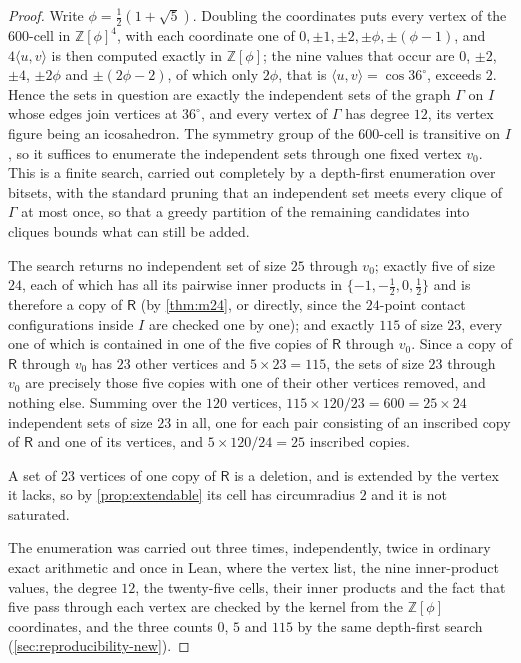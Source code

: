 \documentclass[11pt,reqno]{amsart}
\renewcommand{\_}{\origunderscore\allowbreak}
\numberwithin{equation}{section}
\theoremstyle{plain}
\theoremstyle{definition}
\theoremstyle{remark}
\newcommand{\Rt}{\mathsf{R}}                 %
\begin{document}
\begin{proof}
Write $\phi=\tfrac12(1+\sqrt5)$. Doubling the coordinates puts every
vertex of the $600$-cell in $\mathbb{Z}[\phi]^4$, with each coordinate
one of $0,\pm1,\pm2,\pm\phi,\pm(\phi-1)$, and $4\langle u,v\rangle$ is
then computed exactly in $\mathbb{Z}[\phi]$; the nine values that occur
are $0$, $\pm2$, $\pm4$, $\pm2\phi$ and $\pm(2\phi-2)$, of which only
$2\phi$, that is $\langle u,v\rangle=\cos36^\circ$, exceeds $2$. Hence the
sets in question are exactly the independent sets of the graph $\Gamma$
on $I$ whose edges join vertices at $36^\circ$, and every vertex of
$\Gamma$ has degree $12$, its vertex figure being an icosahedron. The
symmetry group of the $600$-cell is transitive on $I$, so it suffices to
enumerate the independent sets through one fixed vertex $v_0$. This is a
finite search, carried out completely by a depth-first
enumeration over bitsets, with the standard pruning that an independent
set meets every clique of $\Gamma$ at most once, so that a greedy
partition of the remaining candidates into cliques bounds what can still
be added.

The search returns no independent set of size $25$ through $v_0$;
exactly five of size $24$, each of which has all its pairwise inner
products in $\{-1,-\tfrac12,0,\tfrac12\}$ and is therefore a copy of
$\Rt$ (by \cref{thm:m24}, or directly, since the $24$-point contact
configurations inside $I$ are checked one by one); and exactly $115$ of
size $23$, every one of which is contained in one of the five copies of
$\Rt$ through $v_0$. Since a copy of $\Rt$ through $v_0$ has $23$ other
vertices and $5\times23=115$, the sets of size $23$ through $v_0$ are
precisely those five copies with one of their other vertices removed,
and nothing else. Summing over the $120$ vertices, $115\times120/23=600
=25\times24$ independent sets of size $23$ in all, one for each pair
consisting of an inscribed copy of $\Rt$ and one of its vertices, and
$5\times120/24=25$ inscribed copies.

A set of $23$ vertices of one copy of $\Rt$ is a deletion, and is
extended by the vertex it lacks, so by \cref{prop:extendable} its cell
has circumradius $2$ and it is not saturated.

The enumeration was carried out three times, independently, twice in
ordinary exact arithmetic and once in Lean, where the vertex list, the
nine inner-product values, the degree $12$, the twenty-five cells,
their inner products and the fact that five pass through each vertex
are checked by the kernel from the $\mathbb{Z}[\phi]$ coordinates, and
the three counts $0$, $5$ and $115$ by the same depth-first search
(\cref{sec:reproducibility-new}).
\end{proof}
\end{document}

